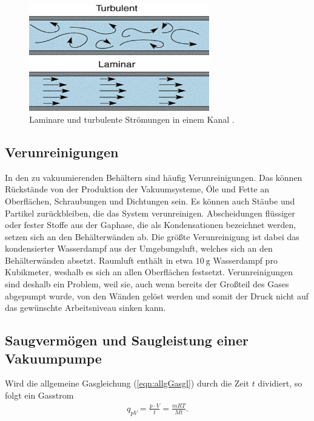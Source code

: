 \begin{figure}[H]
    \centering
    \includegraphics[width=0.7\textwidth]{data/LaminarTurbulent.jpeg}
    \caption{Laminare und turbulente Strömungen in einem Kanal \cite{LaminarTurbulent}.}
    \label{fig:lamiturbi}
\end{figure}

\subsection{Verunreinigungen}
\label{subsec:verunreinigungen}

In den zu vakuumierenden Behältern sind häufig Verunreinigungen. Das können Rückstände von der Produktion der Vakuumsysteme, Öle und Fette an Oberflächen, Schraubungen
und Dichtungen sein. Es können auch Stäube und Partikel zurückbleiben, die das System verunreinigen. Abscheidungen flüssiger oder fester Stoffe aus der Gaphase, die als Kondensationen
bezeichnet werden, setzen sich an den Behälterwänden ab. Die größte Verunreinigung ist dabei das kondensierter Wasserdampf aus der Umgebungsluft, welches sich an den Behälterwänden absetzt. 
Raumluft enthält in etwa $\SI{10}{\gram}$ Wasserdampf pro Kubikmeter, weshalb es sich an allen Oberflächen festsetzt. \newline
Verunreinigungen sind deshalb ein Problem, weil sie, auch wenn bereits der Großteil des Gases abgepumpt wurde, von den Wänden gelöst werden und somit der Druck nicht auf das gewünschte
Arbeitsniveau sinken kann.

\subsection{Saugvermögen und Saugleistung einer Vakuumpumpe}
\label{subsec:Saugleistung}

\noindent
Wird die allgemeine Gasgleichung (\ref{eqn:allgGasgl}) durch die Zeit $t$ dividiert, so folgt ein Gasstrom
\begin{align}
    q_{pV}=\frac{p\cdot V}{t} = \frac{mRT}{Mt}.
    \label{eqn:Gasstrom}
\end{align}

